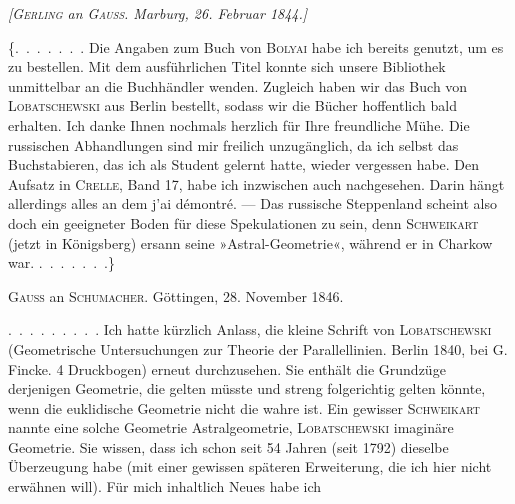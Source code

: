 %
\begin{center}\emph{[\textup{\textsc{Gerling}} an \textup{\textsc{Gauss}}. Marburg, 26. Februar 1844.]}\end{center}

\{\mbox{.\ .\ .\ .\ .\ .\ .} Die Angaben zum Buch von \textsc{Bolyai} habe ich bereits genutzt, um es zu bestellen. Mit dem ausführlichen Titel konnte sich unsere Bibliothek unmittelbar an die Buchhändler wenden. Zugleich haben wir das Buch von \textsc{Lobatschewski} aus Berlin bestellt, sodass wir die Bücher hoffentlich bald erhalten. Ich danke Ihnen nochmals herzlich für Ihre freundliche Mühe. Die russischen Abhandlungen sind mir freilich unzugänglich, da ich selbst das Buchstabieren, das ich als Student gelernt hatte, wieder vergessen habe. Den Aufsatz in \textsc{Crelle}, Band 17, habe ich inzwischen auch nachgesehen. Darin hängt allerdings alles an dem j'ai démontré. --- Das russische Steppenland scheint also doch ein geeigneter Boden für diese Spekulationen zu sein, denn \textsc{Schweikart} (jetzt in Königsberg) ersann seine »Astral-Geometrie«, während er in Charkow war. \mbox{.\ .\ .\ .\ .\ .\ .}\}

\par\bigskip{}

\begin{center}\textsc{Gauss} an \textsc{Schumacher}. Göttingen, 28. November 1846.\end{center}

\mbox{.\ .\ .\ .\ .\ .\ .\ .\ .} Ich hatte kürzlich Anlass, die kleine Schrift von \textsc{Lobatschewski} (Geometrische Untersuchungen zur Theorie der Parallellinien. Berlin 1840, bei G. Fincke. 4 Druckbogen) erneut durchzusehen. Sie enthält die Grundzüge derjenigen Geometrie, die gelten müsste und streng folgerichtig gelten könnte, wenn die euklidische Geometrie nicht die wahre ist. Ein gewisser \textsc{Schweikart} nannte eine solche Geometrie Astralgeometrie, \textsc{Lobatschewski} imaginäre Geometrie. Sie wissen, dass ich schon seit 54 Jahren (seit 1792) dieselbe Überzeugung habe (mit einer gewissen späteren Erweiterung, die ich hier nicht erwähnen will). Für mich inhaltlich Neues habe ich
